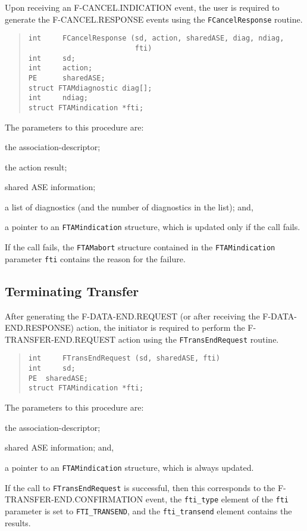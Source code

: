 Upon receiving an {\sf F-CANCEL.INDICATION\/} event,
the user is required to generate the {\sf F-CANCEL.RESPONSE\/}
events using the \verb"FCancelResponse" routine.
\begin{quote}\small\begin{verbatim}
int     FCancelResponse (sd, action, sharedASE, diag, ndiag,
                         fti)
int     sd;
int     action;
PE      sharedASE;
struct FTAMdiagnostic diag[];
int     ndiag;
struct FTAMindication *fti;
\end{verbatim}\end{quote}
The parameters to this procedure are:
\begin{describe}
\item[\verb"sd":] the association-descriptor;

\item[\verb"action":] the action result;

\item[\verb"sharedASE":] shared ASE information;

\item[\verb"diag"/\verb"ndiag":] a list of diagnostics
(and the number of diagnostics in the list);
and,

\item[\verb"fti":] a pointer to an \verb"FTAMindication" structure, which is
updated only if the call fails.
\end{describe}
If the call fails,
the \verb"FTAMabort" structure contained in the
\verb"FTAMindication" parameter \verb"fti" contains the reason for the failure.

\subsection	{Terminating Transfer}
After generating the {\sf F-DATA-END.REQUEST\/}
(or after receiving the {\sf F-DATA-END.RESPONSE\/}) action,
the initiator is required to perform the {\sf F-TRANSFER-END.REQUEST\/}
action using the \verb"FTransEndRequest" routine.
\begin{quote}\small\begin{verbatim}
int     FTransEndRequest (sd, sharedASE, fti)
int     sd;
PE	sharedASE;
struct FTAMindication *fti;
\end{verbatim}\end{quote}
The parameters to this procedure are:
\begin{describe}
\item[\verb"sd":] the association-descriptor;

\item[\verb"sharedASE":] shared ASE information;
and,

\item[\verb"fti":] a pointer to an \verb"FTAMindication" structure, which is
always updated.
\end{describe}
If the call to \verb"FTransEndRequest" is successful,
then this corresponds to the {\sf F-TRANSFER-END.CONFIRMATION\/} event,
the \verb"fti_type" element of the \verb"fti" parameter is set to
\verb"FTI_TRANSEND",
and the \verb"fti_transend" element contains the results.

